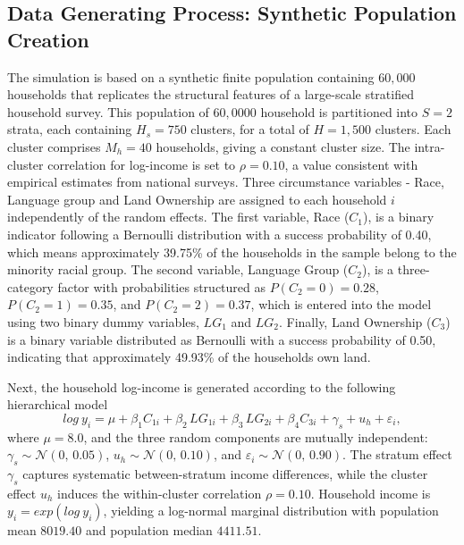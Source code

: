 \documentclass[12pt]{article}
\theoremstyle{plain}
\theoremstyle{definition}
\begin{document}
\subsection{Data Generating Process: Synthetic Population Creation}
\label{subsec:sim_design}
The simulation is based on a synthetic finite population containing $60{,}000$
households that replicates the structural features of a large-scale
stratified household survey. This population of $60,0000$ household is partitioned into $S = 2$ strata, each containing $H_s = 750$ clusters, for a total of $H = 1{,}500$ clusters. Each cluster comprises $M_h = 40$ households, giving a constant
cluster size. The intra-cluster correlation for log-income is set to
$\rho = 0.10$, a value consistent with empirical estimates from national
surveys. Three circumstance variables - Race, Language group and Land Ownership are assigned to each household $i$ independently of the random effects. The first variable, Race ($C_{1}$), is a binary indicator following a Bernoulli distribution with a success probability of 0.40, which means approximately 39.75\% of the households in the sample belong to the minority racial group. The second variable, Language Group ($C_{2}$), is a three-category factor with probabilities structured as $P(C_2 = 0) = 0.28$, $P(C_2 = 1) = 0.35$, and $P(C_2 = 2) = 0.37$, which is entered into the model using two binary dummy variables, ${LG}_{1}$ and $LG_{2}$. Finally, Land Ownership ($C_{3}$) is a binary variable distributed as Bernoulli with a success probability of 0.50, indicating that approximately 49.93\% of the households own land.

Next, the household log-income is generated according to the following hierarchical model
\begin{equation}
    log\ y_i=\mu + \beta_1 C_{1i} + \beta_2\,{LG}_{1i}
                       + \beta_3\,{LG}_{2i} + \beta_4 C_{3i}
                       + \gamma_s + u_h + \varepsilon_i,
    \label{eq:sim_dgp}
\end{equation}
where $\mu = 8.0$, and the three random components are mutually independent:
$\gamma_s \sim \mathcal{N}(0,\, 0.05)$, $u_h \sim \mathcal{N}(0,\, 0.10)$, and
$\varepsilon_i \sim \mathcal{N}(0,\, 0.90)$. The stratum effect $\gamma_s$ captures systematic between-stratum income
differences, while the cluster effect $u_h$ induces the within-cluster correlation $\rho = 0.10$.
Household income is $y_i = exp(log\ y_i)$, yielding a log-normal marginal
distribution with population mean $8019.40$ and population median $4411.51$.
\end{document}
